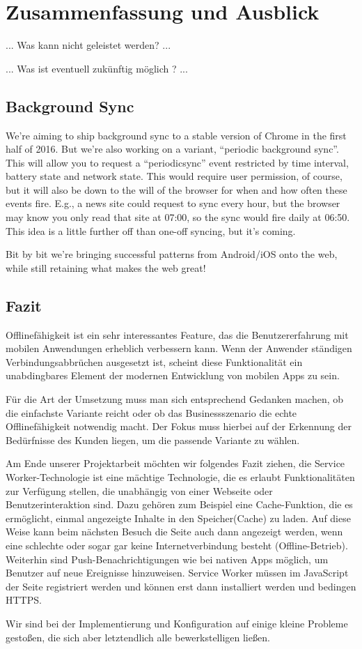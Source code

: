 \chapter{Zusammenfassung und Ausblick}

... Was kann nicht geleistet werden? ...

... Was ist eventuell zukünftig möglich ? ...

\section{Background Sync }

We're aiming to ship background sync to a stable version of Chrome in the first half of 2016. But we’re also working on a variant, “periodic background sync”. This will allow you to request a “periodicsync” event restricted by time interval, battery state and network state. This would require user permission, of course, but it will also be down to the will of the browser for when and how often these events fire. E.g., a news site could request to sync every hour, but the browser may know you only read that site at 07:00, so the sync would fire daily at 06:50. This idea is a little further off than one-off syncing, but it’s coming.

Bit by bit we’re bringing successful patterns from Android/iOS onto the web, while still retaining what makes the web great!


\section{Fazit}

Offlinefähigkeit ist ein sehr interessantes Feature, das die Benutzererfahrung mit mobilen Anwendungen erheblich verbessern kann. Wenn der Anwender ständigen Verbindungsabbrüchen ausgesetzt ist, scheint diese Funktionalität ein unabdingbares Element der modernen Entwicklung von mobilen Apps zu sein.

Für die Art der Umsetzung muss man sich entsprechend Gedanken machen, ob die einfachste Variante reicht oder ob das Businessszenario die echte Offlinefähigkeit notwendig macht. Der Fokus muss hierbei auf der Erkennung der Bedürfnisse des Kunden liegen, um die passende Variante zu wählen.

Am Ende unserer Projektarbeit möchten wir folgendes Fazit ziehen, die Service Worker-Technologie ist eine mächtige Technologie, die es erlaubt Funktionalitäten zur Verfügung stellen, die unabhängig von einer Webseite oder Benutzerinteraktion sind. Dazu gehören zum Beispiel eine Cache-Funktion, die es ermöglicht, einmal angezeigte Inhalte in den Speicher(Cache) zu laden. Auf diese Weise kann beim nächsten Besuch die Seite auch dann angezeigt werden, wenn eine schlechte oder sogar gar keine Internetverbindung besteht (Offline-Betrieb). \\
Weiterhin sind Push-Benachrichtigungen wie bei nativen Apps möglich, um Benutzer auf neue Ereignisse hinzuweisen. Service Worker müssen im JavaScript der Seite registriert werden und können erst dann installiert werden und bedingen HTTPS. 

Wir sind bei der Implementierung und Konfiguration auf einige kleine Probleme gestoßen, die sich aber letztendlich alle bewerkstelligen ließen.  
